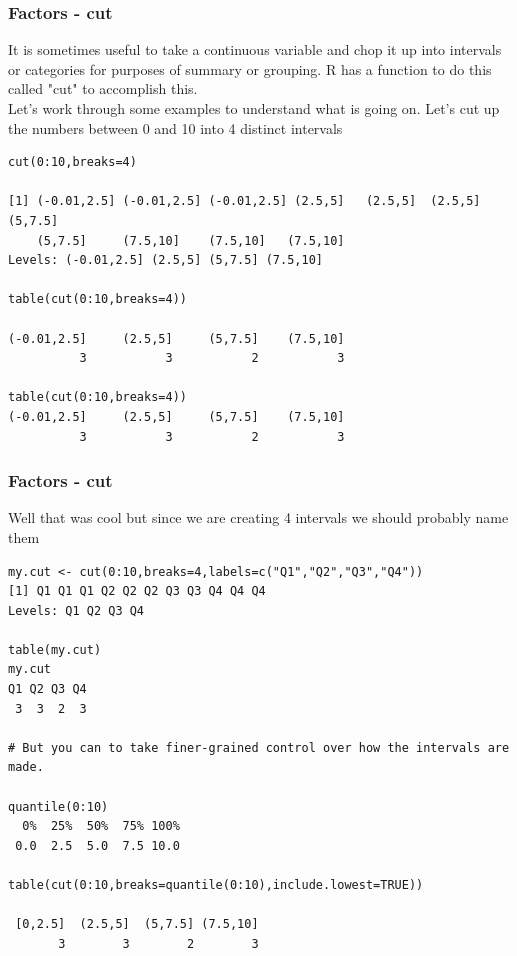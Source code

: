\documentclass{beamer}
\begin{document}
\begin{frame}[fragile]
\frametitle{Factors - cut}
It is sometimes useful to take a continuous variable and chop it up into intervals or categories for purposes of summary or grouping. R has a function to do this called "cut" to accomplish this.
\newline
\\
Let's work through some examples to understand what is going on. Let's cut up the numbers between 0 and 10 into 4 distinct intervals
\scriptsize
\begin{verbatim}
cut(0:10,breaks=4)

[1] (-0.01,2.5] (-0.01,2.5] (-0.01,2.5] (2.5,5]   (2.5,5]  (2.5,5]  (5,7.5] 
    (5,7.5]     (7.5,10]    (7.5,10]   (7.5,10]   
Levels: (-0.01,2.5] (2.5,5] (5,7.5] (7.5,10]

table(cut(0:10,breaks=4))

(-0.01,2.5]     (2.5,5]     (5,7.5]    (7.5,10] 
          3           3           2           3 

table(cut(0:10,breaks=4))
(-0.01,2.5]     (2.5,5]     (5,7.5]    (7.5,10] 
          3           3           2           3 
\end{verbatim}
\end{frame}


\begin{frame}[fragile]
\frametitle{Factors - cut}
Well that was cool but since we are creating 4 intervals we should probably name them
\scriptsize
\begin{verbatim}
my.cut <- cut(0:10,breaks=4,labels=c("Q1","Q2","Q3","Q4")) 
[1] Q1 Q1 Q1 Q2 Q2 Q2 Q3 Q3 Q4 Q4 Q4
Levels: Q1 Q2 Q3 Q4

table(my.cut)
my.cut
Q1 Q2 Q3 Q4 
 3  3  2  3 

# But you can to take finer-grained control over how the intervals are made.

quantile(0:10)
  0%  25%  50%  75% 100% 
 0.0  2.5  5.0  7.5 10.0 

table(cut(0:10,breaks=quantile(0:10),include.lowest=TRUE))

 [0,2.5]  (2.5,5]  (5,7.5] (7.5,10] 
       3        3        2        3 

\end{verbatim}
\end{frame}


%
\end{document}
